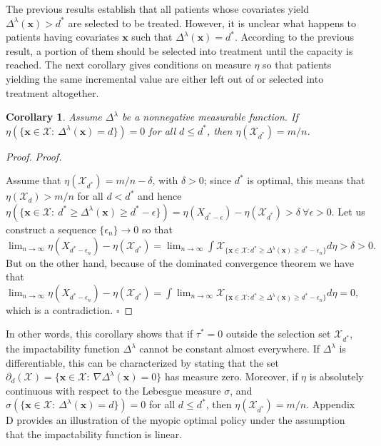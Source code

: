 \documentclass[12pt,a4paper]{article}
\newtheorem{corollary}{Corollary}
\newcommand{\bx}{\mathbf{x}}
\newcommand{\mX}{\mathcal{X}}
\begin{document}
		
		The previous results establish that all patients whose covariates yield $\Delta^\lambda(\bx)>d^*$ are selected to be treated. However, it is unclear what happens to patients having covariates $\bx$ such that $\Delta^\lambda(\bx)=d^*$. According to the previous result, a portion of them should be selected into treatment until the capacity is reached.  The next corollary gives conditions on measure $\eta$ so that patients yielding the same incremental value are either left out of or selected into treatment altogether.
		
		\begin{corollary}\label{corollary:1-0}
			Assume $\Delta^\lambda$ be a nonnegative measurable function. If $\eta(\{\bx \in \mathcal{X}: \ \Delta^\lambda(\bx)=d\})=0$ for all $d\leq d^*$, then  $\eta(\mathcal{X}_{d^*})=m/n$.
		\end{corollary}
		
		\begin{proof} {\it Proof.}
			
			Assume that $\eta(\mX_{d^*})=m/n-\delta$, with $\delta>0$; since $d^*$ is optimal, this means that $\eta(\mX_{d})>m/n$ for all $d<d^*$ and hence $\eta(\{\bx \in \mX: \ d^*\geq \Delta^\lambda(\bx) \geq d^*-\epsilon \})= \eta(X_{d^*-\epsilon})-\eta(\mX_{d^*})>\delta \ \forall \epsilon>0.$
			Let us construct a sequence $\{\epsilon_n\} \rightarrow 0$ so that $\lim_{n \rightarrow \infty}  \eta(X_{d^*-\epsilon_n})-\eta(\mX_{d^*})=\lim_{n \rightarrow \infty}  \int \mathcal{X}_{\{\bx \in \mX:  d^*\geq \Delta^\lambda(\bx) \geq d^*-\epsilon_n\}} d\eta > \delta >0.$
			But on the other hand, because of the dominated convergence theorem we have that
			$ \lim_{n \rightarrow \infty}  \eta(X_{d^*-\epsilon_n})-\eta(\mX_{d^*}) =\int \lim_{n \rightarrow \infty}   \mathcal{X}_{\{\bx \in \mX:  d^*\geq \Delta^\lambda(\bx) \geq d^*-\epsilon_n\}} d\eta= 0,$ which is a contradiction. \hfill $\square$
		\end{proof}
		
		In other words, this corollary shows that if $\tau^*=0$ outside the selection set $\mathcal{X}_{d^*}$, the impactability function $\Delta^\lambda$ cannot be constant almost everywhere. If $\Delta^\lambda$ is differentiable, this can be characterized by stating that the set $\partial_d(\mathcal{X})=\{\bx \in \mathcal{X}: \ \nabla \Delta^\lambda(\bx)=0\}$ has measure zero. Moreover, if $\eta$ is absolutely continuous with respect to the Lebesgue measure $\sigma$, and $\sigma(\{\bx \in \mathcal{X}: \ \Delta^\lambda(\bx)=d\})=0$ for all $d\leq d^*$, then $\eta(\mathcal{X}_{d^*})=m/n$. 
        Appendix D provides an illustration of the myopic optimal policy under the assumption that the impactability function is linear.
       
\end{document}
